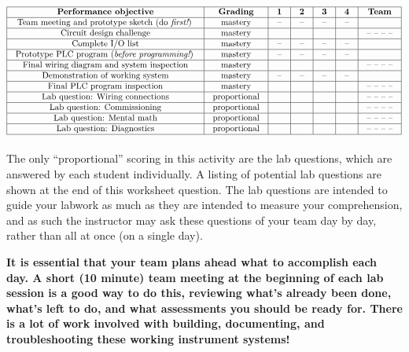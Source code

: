 $$\vbox{\offinterlineskip
\halign{\strut
\vrule \quad\hfil # \ \hfil & 
\vrule \quad\hfil # \ \hfil & 
\vrule \quad\hfil # \ \hfil & 
\vrule \quad\hfil # \ \hfil & 
\vrule \quad\hfil # \ \hfil & 
\vrule \quad\hfil # \ \hfil & 
\vrule \quad\hfil # \ \hfil \vrule \cr
\noalign{\hrule}
%
{\bf Performance objective} & {\bf Grading} & {\bf 1} & {\bf 2} & {\bf 3} & {\bf 4} & {\bf Team} \cr
%
\noalign{\hrule}
%
Team meeting and prototype sketch (do {\it first!}) & mastery & -- & -- & -- & -- & \cr
%
\noalign{\hrule}
%
Circuit design challenge & mastery & & & & & -- -- -- -- \cr
%
\noalign{\hrule}
%
Complete I/O list & mastery & -- & -- & -- & -- & \cr
%
\noalign{\hrule}
%
Prototype PLC program ({\it before programming!}) & mastery & -- & -- & -- & -- & \cr
%
\noalign{\hrule}
%
Final wiring diagram and system inspection & mastery & & & & & -- -- -- -- \cr
%
\noalign{\hrule}
%
Demonstration of working system & mastery & -- & -- & -- & -- & \cr
%
\noalign{\hrule}
%
Final PLC program inspection & mastery &  &  &  &  & -- -- -- --  \cr
%
\noalign{\hrule}
%
Lab question: Wiring connections & proportional &  &  &  &  & -- -- -- -- \cr
%
\noalign{\hrule}
%
Lab question: Commissioning & proportional &  &  &  &  & -- -- -- -- \cr
%
\noalign{\hrule}
%
Lab question: Mental math & proportional &  &  &  &  & -- -- -- -- \cr
%
\noalign{\hrule}
%
Lab question: Diagnostics & proportional &  &  &  &  & -- -- -- -- \cr
%
\noalign{\hrule}
} %
}$$ %

The only ``proportional'' scoring in this activity are the lab questions, which are answered by each student individually.  A listing of potential lab questions are shown at the end of this worksheet question.  The lab questions are intended to guide your labwork as much as they are intended to measure your comprehension, and as such the instructor may ask these questions of your team day by day, rather than all at once (on a single day).

\vskip 10pt

{\bf It is essential that your team plans ahead what to accomplish each day.  A short (10 minute) team meeting at the beginning of each lab session is a good way to do this, reviewing what's already been done, what's left to do, and what assessments you should be ready for.  There is a lot of work involved with building, documenting, and troubleshooting these working instrument systems!}


